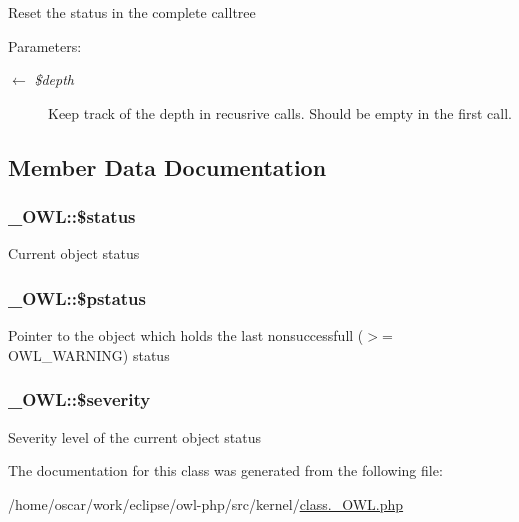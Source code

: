Reset the status in the complete calltree

\begin{Desc}
\item[Parameters:]
\begin{description}
\item[\mbox{$\leftarrow$} {\em \$depth}]Keep track of the depth in recusrive calls. Should be empty in the first call. \end{description}
\end{Desc}


\subsection{Member Data Documentation}
\hypertarget{class__OWL_af448f6bc8a90e20c09e9e2b8fe46eb5}{
\subsubsection{\setlength{\rightskip}{0pt plus 5cm}\_\-OWL::\$status}}
\label{class__OWL_af448f6bc8a90e20c09e9e2b8fe46eb5}


Current object status \hypertarget{class__OWL_f30c6ce2c59df6da2ef0f7059be9231e}{
\subsubsection{\setlength{\rightskip}{0pt plus 5cm}\_\-OWL::\$pstatus}}
\label{class__OWL_f30c6ce2c59df6da2ef0f7059be9231e}


Pointer to the object which holds the last nonsuccessfull ($>$= OWL\_\-WARNING) status \hypertarget{class__OWL_d26b40a9dbbacb33e299b17826f8327c}{
\subsubsection{\setlength{\rightskip}{0pt plus 5cm}\_\-OWL::\$severity}}
\label{class__OWL_d26b40a9dbbacb33e299b17826f8327c}


Severity level of the current object status 

The documentation for this class was generated from the following file:\begin{CompactItemize}
\item 
/home/oscar/work/eclipse/owl-php/src/kernel/\hyperlink{class_8__OWL_8php}{class.\_\-OWL.php}\end{CompactItemize}

